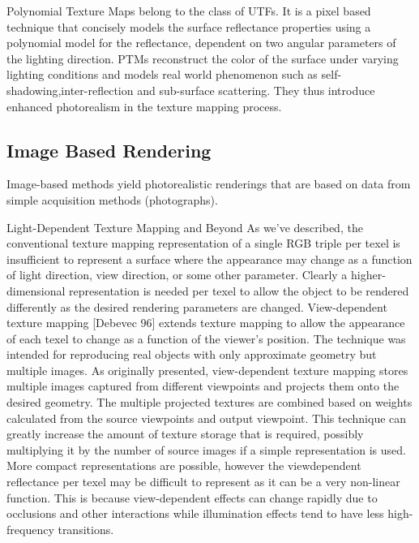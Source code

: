 Polynomial Texture Maps belong to the class of UTFs. It is a pixel
based technique that concisely models the surface reflectance properties using a
polynomial model for the reflectance, dependent on two angular parameters of the
lighting direction. PTMs reconstruct the color of the surface under varying
lighting conditions and models real world phenomenon such as
self-shadowing,inter-reflection and sub-surface scattering. They thus introduce
enhanced photorealism in the texture mapping process.

\subsection{Image Based Rendering}





Image-based methods yield photorealistic renderings that are based on
data from simple acquisition methods (photographs). 

Light-Dependent Texture Mapping and Beyond
As we've described, the conventional texture mapping representation of a single RGB triple per texel is 
insufficient to represent a surface where the appearance may change as a function of light direction, view 
direction, or some other parameter. Clearly a higher-dimensional representation is needed per texel to allow the
object to be rendered differently as the desired rendering parameters are changed. View-dependent texture
mapping [Debevec 96] extends texture mapping to allow the appearance of each texel to change as a function of
the viewer's position. The technique was intended for reproducing real objects with only approximate geometry
but multiple images. As originally presented, view-dependent texture mapping stores multiple images captured 
from different viewpoints and projects them onto the desired geometry. The multiple projected textures are
combined based on weights calculated from the source viewpoints and output viewpoint. This technique can
greatly increase the amount of texture storage that is required, possibly multiplying it by the number of source
images if a simple representation is used. More compact representations are possible, however the viewdependent 
reflectance per texel may be difficult to represent as it can be a very non-linear function. This is
because view-dependent effects can change rapidly due to occlusions and other interactions while illumination
effects tend to have less high-frequency transitions.

